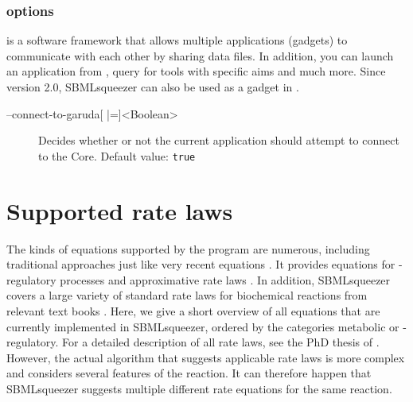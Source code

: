 \subsection{\Garuda options}

\Garuda is a software framework that allows multiple applications (gadgets) to
communicate with each other by sharing data files. In addition, you can launch
an application from \Garuda, query for tools with specific aims and much more.
Since version 2.0, SBMLsqueezer can also be used as a gadget in \Garuda.

\begin{description}
\item[--connect-to-garuda{[} |={]}<Boolean>]
  Decides whether or not the current application should attempt to connect to
  the \Garuda Core. Default value: \texttt{true}
\end{description}
\renewcommand{\descriptionlabel}[1]{\textcolor{black}{\textbf{#1}}}

\chapter{Supported rate laws}\label{chap:RateLaws}

The kinds of equations supported by the program are
numerous, including traditional approaches \citep{Guldberg1879, Michaelis1913}
just like very recent equations \citep{Liebermeister2006, Liebermeister2010}.
It provides equations for {\gene}-regulatory processes
\citep{Hinze2007, Radde2007a, Toepfer2007, Vu2007,Weaver1999} and approximative
rate laws \citep{Savageau1969}.
In addition, SBMLsqueezer covers a large variety of standard rate laws for
biochemical reactions from relevant text books
\citep{Segel1993, Heinrich1996, Bisswanger2000, Cornish-Bowden2004}.
Here, we give a short overview of all equations that are currently implemented
in SBMLsqueezer, ordered by the categories metabolic or {\gene}-regulatory.
For a detailed description of all rate laws, see the PhD thesis of \citealp{Draeger2011a}.
However, the actual algorithm that suggests applicable rate laws is more complex
and considers several features of the reaction.
It can therefore happen that SBMLsqueezer suggests multiple different rate
equations for the same reaction.

